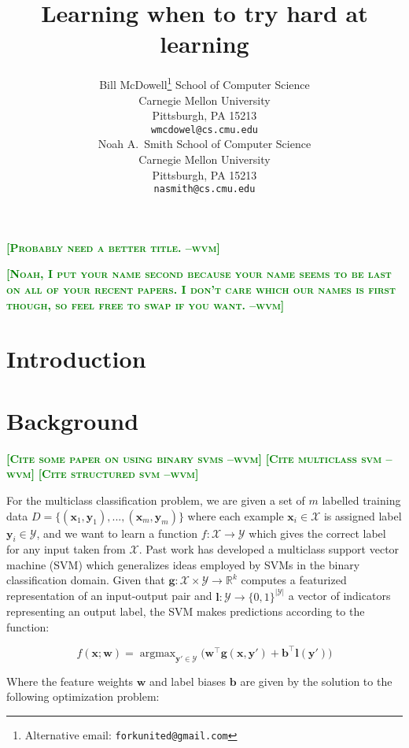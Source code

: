 \documentclass{article} %
\title{Learning when to try hard at learning}
\author{
Bill McDowell\thanks{Alternative email: \texttt{forkunited@gmail.com}}
School of Computer Science\\
Carnegie Mellon University\\
Pittsburgh, PA 15213 \\
\texttt{wmcdowel@cs.cmu.edu} \\
\And
Noah A.~Smith
School of Computer Science\\
Carnegie Mellon University\\
Pittsburgh, PA 15213 \\
\texttt{nasmith@cs.cmu.edu} \\
}
\DeclareMathOperator*{\argmax}{argmax}
\newcommand{\bmcomment}[1]{\textcolor{green}{\textsc{\textbf{[#1 --wvm]}}}}
\begin{document}
\maketitle

\bmcomment{Probably need a better title.}

\bmcomment{Noah, I put your name second because your name seems 
to be last on all of your recent papers.  I don't care which our names is
first though, so feel free to swap if you want.}

\begin{abstract}
\end{abstract}

\section{Introduction}

\section{Background}

\bmcomment{Cite some paper on using binary svms}
\bmcomment{Cite multiclass svm}
\bmcomment{Cite structured svm}

For the multiclass classification problem, we are given a set of
$m$ labelled training data
$D=\{(\mathbf{x}_1,\mathbf{y}_1),...,(\mathbf{x}_m, \mathbf{y}_m)\}$ where each
example $\mathbf{x}_i\in \mathcal{X}$ is assigned label 
$\mathbf{y}_i\in\mathcal{Y}$, and we want to learn a function 
$f:\mathcal{X}\rightarrow\mathcal{Y}$ which gives the correct
label for any input taken from $\mathcal{X}$.  Past work has developed
a multiclass support vector machine (SVM) which generalizes ideas
employed by SVMs in the binary classification domain.  Given that
$\mathbf{g}:\mathcal{X}\times\mathcal{Y}\rightarrow \mathbb{R}^k$ 
computes a featurized representation of an input-output pair and
$\mathbf{l}:\mathcal{Y}\rightarrow\{0,1\}^{|\mathcal{Y}|}$ a 
vector of indicators representing an output label, the SVM makes 
predictions according to the function:

\begin{equation}
\label{prediction}
f(\mathbf{\mathbf{x};\mathbf{w}})=\argmax_{\mathbf{y}'\in\mathcal{Y}}\Big( \mathbf{w}^\top \mathbf{g}(\mathbf{x},\mathbf{y}')+\mathbf{b}^\top\mathbf{l}(\mathbf{y}') \Big)
\end{equation}

Where the feature weights $\mathbf{w}$ and label biases $\mathbf{b}$
are given by the solution to the following optimization problem:
\end{document}
